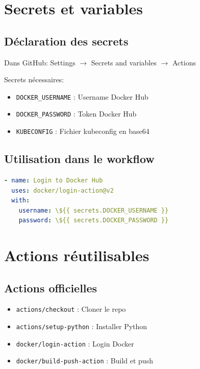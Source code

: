 \documentclass[12pt,a4paper,twoside]{report}
\begin{document}
\section{Secrets et variables}

\subsection{Déclaration des secrets}

Dans GitHub: Settings $\rightarrow$ Secrets and variables $\rightarrow$ Actions

Secrets nécessaires:
\begin{itemize}
    \item \texttt{DOCKER\_USERNAME} : Username Docker Hub
    \item \texttt{DOCKER\_PASSWORD} : Token Docker Hub
    \item \texttt{KUBECONFIG} : Fichier kubeconfig en base64
\end{itemize}

\subsection{Utilisation dans le workflow}

\begin{lstlisting}[language=yaml]
- name: Login to Docker Hub
  uses: docker/login-action@v2
  with:
    username: \${{ secrets.DOCKER_USERNAME }}
    password: \${{ secrets.DOCKER_PASSWORD }}
\end{lstlisting}

\section{Actions réutilisables}

\subsection{Actions officielles}

\begin{itemize}
    \item \texttt{actions/checkout} : Cloner le repo
    \item \texttt{actions/setup-python} : Installer Python
    \item \texttt{docker/login-action} : Login Docker
    \item \texttt{docker/build-push-action} : Build et push
\end{itemize}
\end{document}
